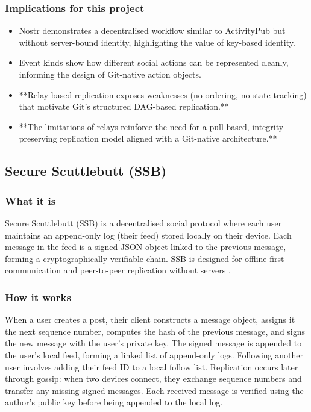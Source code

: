 \subsubsection{Implications for this project}
\begin{itemize}
    \item Nostr demonstrates a decentralised workflow similar to ActivityPub but without server-bound identity, highlighting the value of key-based identity.
    \item Event kinds show how different social actions can be represented cleanly, informing the design of Git-native action objects.
    \item **Relay-based replication exposes weaknesses (no ordering, no state tracking) that motivate Git’s structured DAG-based replication.**
    \item **The limitations of relays reinforce the need for a pull-based, integrity-preserving replication model aligned with a Git-native architecture.**
\end{itemize}

\subsection{Secure Scuttlebutt (SSB)}

\subsubsection{What it is}
Secure Scuttlebutt (SSB) is a decentralised social protocol where each user maintains an append-only log (their feed) stored locally on their device. Each message in the feed is a signed JSON object linked to the previous message, forming a cryptographically verifiable chain. SSB is designed for offline-first communication and peer-to-peer replication without servers \cite{ssbConsortium2026}.

\subsubsection{How it works}
When a user creates a post, their client constructs a message object, assigns it the next sequence number, computes the hash of the previous message, and signs the new message with the user’s private key. The signed message is appended to the user’s local feed, forming a linked list of append-only logs. Following another user involves adding their feed ID to a local follow list. Replication occurs later through gossip: when two devices connect, they exchange sequence numbers and transfer any missing signed messages. Each received message is verified using the author’s public key before being appended to the local log.


